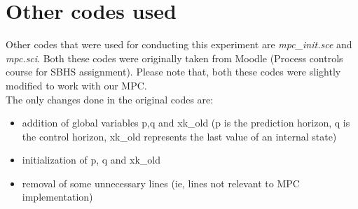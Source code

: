 \section{Other codes used}\label{mpccode}
Other codes that were used for conducting this experiment are \emph{mpc\_init.sce} and \emph{mpc.sci}. Both these codes were originally taken from Moodle (Process controls course for SBHS assignment). Please note that, both these codes were slightly modified to work with our MPC. \\
The only changes done in the original codes are: 
\begin{itemize}
\item addition of global variables p,q and xk\_old (p is the prediction horizon, q is the control horizon, xk\_old represents the last value of an internal state)
\item initialization of p, q and xk\_old
\item removal of some unnecessary lines (ie, lines not relevant to MPC implementation)
\end{itemize}



